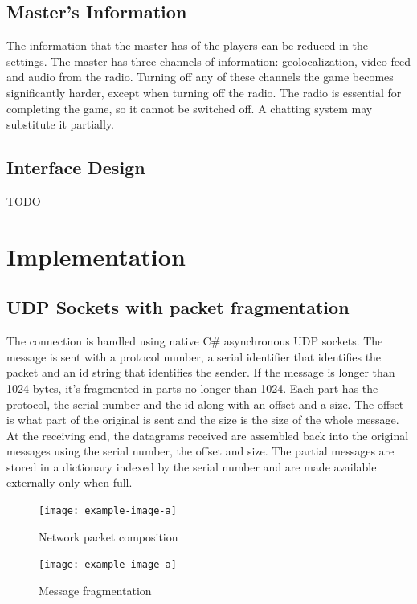 \documentclass{article}
\begin{document}
\subsection{Master's Information}
The information that the master has of the players can be reduced in the settings. The master has three channels of information: geolocalization, video feed and audio from the radio. Turning off any of these channels the game becomes significantly harder, except when turning off the radio. The radio is essential for completing the game, so it cannot be switched off. A chatting system may substitute it partially.

\subsection{Interface Design}
TODO

\clearpage

\section{Implementation}

\subsection{UDP Sockets with packet fragmentation}
The connection is handled using native C\# asynchronous UDP sockets. The message is sent with a protocol number, a serial identifier that identifies the packet and an id string that identifies the sender. If the message is longer than 1024 bytes, it's fragmented in parts no longer than 1024. Each part has the protocol, the serial number and the id along with an offset and a size. The offset is what part of the original is sent and the size is the size of the whole message. At the receiving end, the datagrams received are assembled back into the original messages using the serial number, the offset and size. The partial messages are stored in a dictionary indexed by the serial number and are made available externally only when full. 
\begin{figure}[H]
\texttt{[image: example-image-a]}
\caption{Network packet composition}
\end{figure}
\begin{figure}[H]
\texttt{[image: example-image-a]}
\caption{Message fragmentation}
\end{figure}
\end{document}
